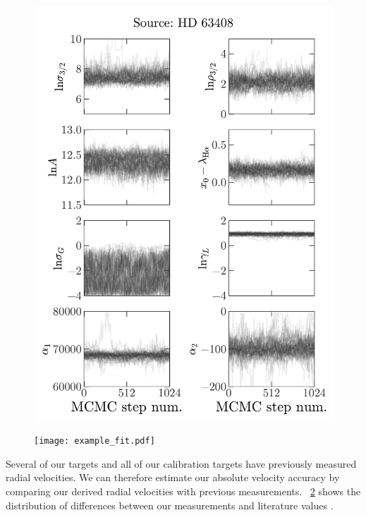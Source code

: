 \documentclass[modern, letterpaper]{aastex61}
\begin{document}
\begin{figure}[htbp]
  \begin{center}
    \includegraphics[width=\linewidth]{mcmc_trace.pdf}
  \end{center}
  \caption{%
    \label{fig:Halpha-mcmc}}
\end{figure}

\begin{figure}[htbp]
  \begin{center}
    \texttt{[image: example\_fit.pdf]}
  \end{center}
  \caption{%
    \label{fig:compare-previous}}
\end{figure}

Several of our targets and all of our calibration targets have previously
measured radial velocities.
We can therefore estimate our absolute velocity accuracy by comparing our
derived radial velocities with previous measurements.
\figurename~\ref{fig:compare-previous} shows the distribution of differences
between our measurements and literature values .
\end{document}

